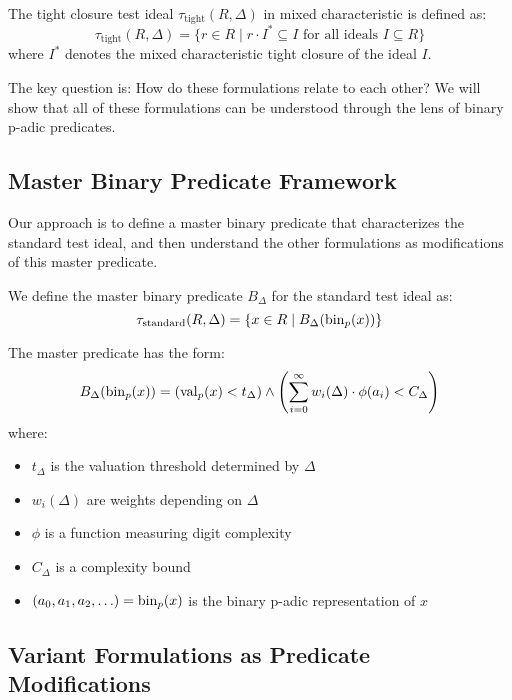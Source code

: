 \begin{definition}\label{def:tight-closure-test-ideal-mixed}
The tight closure test ideal $\tau_{\text{tight}}(R,\Delta)$ in mixed characteristic is defined as:
$$\tau_{\text{tight}}(R,\Delta) = \{r \in R \mid r \cdot I^{*} \subseteq I \text{ for all ideals } I \subseteq R\}$$
where $I^{*}$ denotes the mixed characteristic tight closure of the ideal $I$.
\end{definition}

The key question is: How do these formulations relate to each other? We will show that all of these formulations can be understood through the lens of binary p-adic predicates.

\subsection{Master Binary Predicate Framework}

Our approach is to define a master binary predicate that characterizes the standard test ideal, and then understand the other formulations as modifications of this master predicate.

\begin{definition}\label{def:master-binary-predicate}
We define the master binary predicate $B_\Delta$ for the standard test ideal as:
$$\tau_{\text{standard}}(R,\Delta) = \{x \in R \mid B_\Delta(\operatorname{bin}_p(x))\}$$

The master predicate has the form:
$$B_\Delta(\operatorname{bin}_p(x)) = \left(\operatorname{val}_p(x) < t_\Delta\right) \wedge \left(\sum_{i=0}^{\infty} w_i(\Delta) \cdot \phi(a_i) < C_\Delta\right)$$
where:
\begin{itemize}
    \item $t_\Delta$ is the valuation threshold determined by $\Delta$
    \item $w_i(\Delta)$ are weights depending on $\Delta$
    \item $\phi$ is a function measuring digit complexity
    \item $C_\Delta$ is a complexity bound
    \item $(a_0, a_1, a_2, \ldots) = \operatorname{bin}_p(x)$ is the binary p-adic representation of $x$
\end{itemize}
\end{definition}

\subsection{Variant Formulations as Predicate Modifications}

